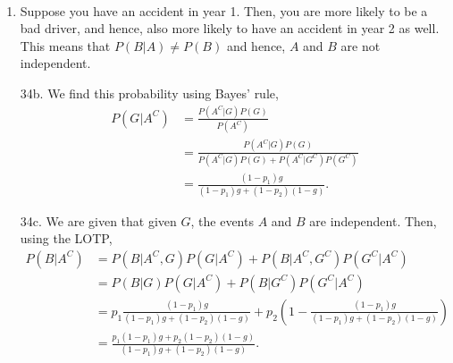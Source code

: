 

\setcounter{theorem}{33}

\begin{exercise} [BH.2.34] 
\begin{solution}~
	\begin{enumerate}
		\item Suppose you have an accident in year 1. Then, you are more likely to be a bad driver, and hence, also more likely to have an accident in year 2 as well. This means that $P(B|A)\neq P(B)$ and hence, $A$ and $B$ are not independent.
		\item[34b.] We find this probability using Bayes' rule,
		\begin{align*}
			P(G|A^{C})& =\frac{P(A^{C}|G)P(G)}{P(A^{C})}\\ &=\frac{P(A^{C}|G)P(G)}{P(A^{C}|G)P(G) + P(A^{C}|G^C)P(G^C)}\\
			&= \frac{(1-p_{1})g}{(1-p_{1})g + (1-p_{2})(1-g)}.
		\end{align*}
		\item[34c.] We are given that given $G$, the events $A$ and $B$ are independent. Then, using the LOTP,
 		\begin{align*}
			P(B|A^{C})& = P(B|A^{C},G)P(G|A^{C}) + P(B|A^{C},G^{C})P(G^{C}|A^{C})\\
			&=P(B|G)P(G|A^{C}) + P(B|G^{C})P(G^{C}|A^{C})\\
			&=p_{1}\frac{(1-p_{1})g}{(1-p_{1})g + (1-p_{2})(1-g)} + p_{2}\left(1-\frac{(1-p_{1})g}{(1-p_{1})g + (1-p_{2})(1-g)}\right)\\
			&=\frac{p_{1}(1-p_{1})g + p_{2}(1-p_{2})(1-g)}{(1-p_{1})g + (1-p_{2})(1-g)}.
		\end{align*}
	\end{enumerate}
\end{solution}
\end{exercise}


